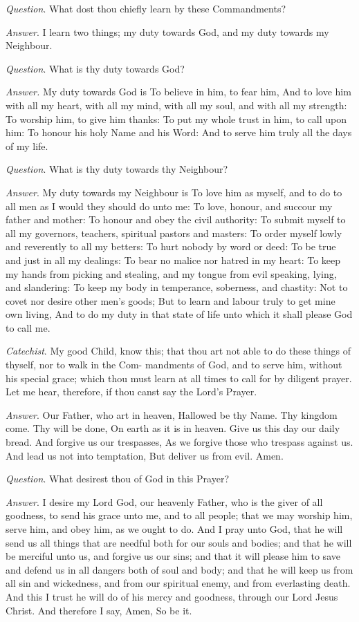 \emph{Question}. What dost thou chiefly learn
by these Commandments?

\emph{Answer}. I learn two things; my duty towards
God, and my duty towards my Neighbour.

\emph{Question}. What is thy duty towards God?

\emph{Answer.} My duty towards God is To believe
in him, to fear him, And to love him with all my heart, with all my mind,
with all my soul, and with all my strength: To worship him, to give him
thanks: To put my whole trust in him, to call upon him: To honour his
holy Name and his Word: And to serve him truly all the days of my life.

\emph{Question}. What is thy duty towards thy
Neighbour?

\emph{Answer}. My duty towards my Neighbour
is To love him as myself, and to do to all men as I would they should
do unto me: To love, honour, and succour my father and mother: To honour
and obey the civil authority: To submit myself to all my governors, teachers,
spiritual pastors and masters: To order myself lowly and reverently to
all my betters: To hurt nobody by word or deed: To be true and just in
all my dealings: To bear no malice nor hatred in my heart: To keep my
hands from picking and stealing, and my tongue from evil speaking, lying,
and slandering: To keep my body in temperance, soberness, and chastity:
Not to covet nor desire other men's goods; But to learn and labour truly
to get mine own living, And to do my duty in that state of life unto which
it shall please God to call me.

\emph{Catechist}. My good Child, know this; that
thou art not able to do these things of thyself, nor to walk in the Com-
mandments of God, and to serve him, without his special grace; which thou
must learn at all times to call for by diligent prayer. Let me hear, therefore,
if thou canst say the Lord’s Prayer.

\emph{Answer}. Our Father, who art in heaven,
Hallowed be thy Name. Thy kingdom come. Thy will be done, On earth as
it is in heaven. Give us this day our daily bread. And forgive us our
trespasses, As we forgive those who trespass against us. And lead us not
into temptation, But deliver us from evil. Amen.

\emph{Question}. What desirest thou of God in
this Prayer?

\emph{Answer}. I desire my Lord God, our heavenly
Father, who is the giver of all goodness, to send his grace unto me, and
to all people; that we may worship him, serve him, and obey him, as we
ought to do. And I pray unto God, that he will send us all things that
are needful both for our souls and bodies; and that he will be merciful
unto us, and forgive us our sins; and that it will please him to save
and defend us in all dangers both of soul and body; and that he will keep
us from all sin and wickedness, and from our spiritual enemy, and from
everlasting death. And this I trust he will do of his mercy and goodness,
through our Lord Jesus Christ. And therefore I say, Amen, So be it.

